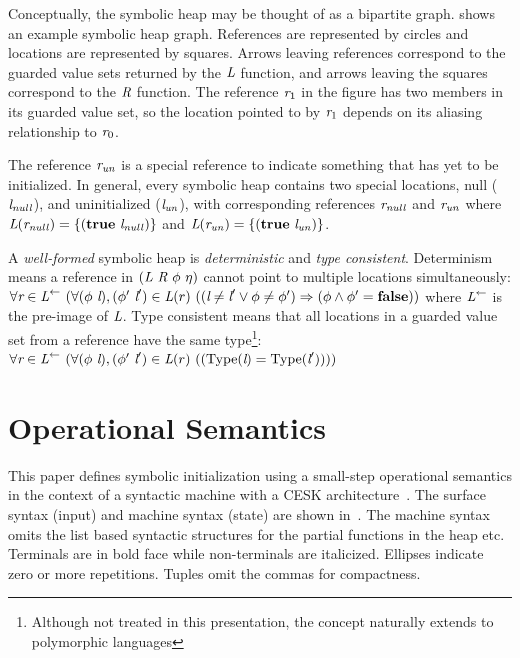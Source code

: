 Conceptually, the symbolic heap may be thought of as a bipartite
graph.  shows an example symbolic heap
graph. References are represented by circles and locations are
represented by squares. Arrows leaving references correspond to the
guarded value sets returned by the $\emph{L}$ function, and arrows
leaving the squares correspond to the $\emph{R}$ function. The
reference $\emph{r}_1$ in the figure has two members in its guarded value set,
so the location pointed to by $\emph{r}_1$ depends on its aliasing
relationship to $\emph{r}_0$.

The reference $\emph{r}_\mathit{un}$ is a special reference to
indicate something that has yet to be initialized. In general, every
symbolic heap contains two special locations, null
($\emph{l}_\mathit{null}$), and uninitialized
($\emph{l}_\mathit{un}$), with corresponding references
$\emph{r}_\mathit{null}$ and $\emph{r}_\mathit{un}$ where
$\emph{L}(\emph{r}_\mathit{null}) =
\{(\textbf{true}\ \emph{l}_\mathit{null})\}$ and
$\emph{L}(\emph{r}_\mathit{un}) =
\{(\textbf{true}\ \emph{l}_\mathit{un})\}$.

A \emph{well-formed} symbolic heap is \emph{deterministic} and \emph{type consistent}. Determinism means a reference in $(\emph{L}\ \emph{R}\ \phi\ \eta)$ cannot point to multiple locations simultaneously: 
$
\forall \cfgnt{r} \in \cfgnt{L}^\leftarrow\ (\forall (\phi\ \cfgnt{l}),(\phi^\prime\ \cfgnt{l}^\prime) \in \cfgnt{L}(r)\ (
(\cfgnt{l} \neq \cfgnt{l}^\prime \vee \phi \neq \phi^\prime) \Rightarrow (\phi \wedge \phi^\prime = \cfgt{false}))
$
where $\emph{L}^\leftarrow$ is the pre-image of $\emph{L}$.
Type consistent means that all locations in a guarded value set from a reference have the same type\footnote{Although not treated in this presentation, the concept naturally extends to polymorphic languages}:
$\forall \cfgnt{r} \in \cfgnt{L}^\leftarrow\ (\forall (\phi\ \cfgnt{l}),(\phi^\prime\ \cfgnt{l}^\prime) \in \cfgnt{L}(r)\ (
(\mathrm{Type}\lp\cfgnt{l}\rp = \mathrm{Type}\lp\cfgnt{l}^\prime\rp)))$

\section{Operational Semantics}
This paper defines symbolic initialization using
a small-step operational semantics in the context of a syntactic machine with a CESK architecture~\cite{Felleisen:1992, saints-MS}. The
surface  syntax  (input) and machine  syntax (state) are shown
in~. The machine syntax omits the list based syntactic structures for the partial functions in the heap etc.  Terminals are in bold face while non-terminals
are italicized. Ellipses indicate zero or more repetitions. Tuples
omit the commas for compactness.

